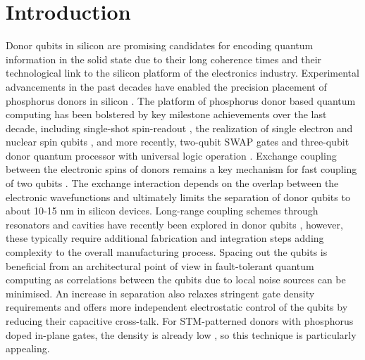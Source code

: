 \documentclass[%
showkeys,
 amsmath,amssymb,
 aps,
prb,
]{revtex4-2}
\begin{document}
\section{Introduction}
Donor qubits in silicon are promising candidates for encoding quantum information in the solid state due to their long coherence times \cite{muhonen_storing_2014,stegerQuantumInformationStorage2012,tyryshkin_electron_2012} and their technological link to the silicon platform of the electronics industry. Experimental advancements in the past decades have enabled the precision placement of phosphorus donors in silicon \cite{schofieldAtomicallyPrecisePlacement2003,clarkProgressSiliconbasedQuantum2003,simmonsScanningProbeMicroscopy2005,ruessRealizationAtomicallyControlled2007,fuechsleSingleatomTransistor2012b}. The platform of phosphorus donor based quantum computing has been bolstered by key milestone achievements over the last decade, including single-shot spin-readout \cite{morelloSingleshotReadoutElectron2010}, the realization of single electron and nuclear spin qubits \cite{plaSingleatomElectronSpin2012,pla_high-fidelity_2013}, and more recently, two-qubit SWAP gates
\cite{heTwoqubitGatePhosphorus2019} and three-qubit donor quantum processor with universal logic operation \cite{madzikPrecisionTomographyThreequbit2022}. 
Exchange coupling between the electronic spins of donors remains a key mechanism for fast coupling of two qubits \cite{heTwoqubitGatePhosphorus2019,kaneSiliconbasedNuclearSpin1998}. The exchange interaction depends on the overlap between the electronic wavefunctions and ultimately limits the separation of donor qubits to about 10-15 nm in silicon devices. Long-range coupling schemes through resonators and cavities have recently been explored in donor qubits \cite{tosi_silicon_2017,morse_photonic_2017,Osika2022}, however, these typically require additional fabrication and integration steps adding complexity to the overall manufacturing process. Spacing out the qubits is beneficial from an architectural point of view in fault-tolerant quantum computing \cite{vandersypen_interfacing_2017} as correlations between the qubits due to local noise sources can be minimised. An increase in separation also relaxes stringent gate density requirements and offers more independent electrostatic control of the qubits by reducing their capacitive cross-talk. For STM-patterned donors with phosphorus doped in-plane gates, the density is already low \cite{kiczynski_engineering_2022}, so this technique is particularly appealing. 
\end{document}
